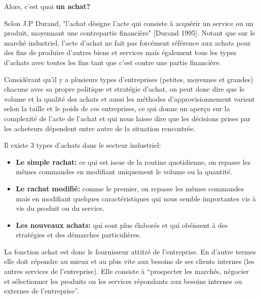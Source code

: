 \documentclass[12pt]{article}
\begin{document}
Alors, c’est quoi \textbf{un achat?}

Selon J.P Durand, "l'achat désigne l’acte qui consiste à acquérir un service ou un produit, moyennant une contrepartie financière" {\color{red}[Durand 1995]}. Notant que sur le marché industriel, l’acte d’achat ne fait pas forcément référence aux achats pour des fins de produire d’autres biens et services mais également tous les types d’achats avec toutes les fins tant que c’est contre une partie financière.

Considérant qu’il y a plusieurs types d’entreprises (petites, moyennes et grandes) chacune avec sa propre politique et stratégie d’achat, on peut donc dire que le volume et la qualité des achats et aussi les méthodes d’approvisionnement varient selon la taille et le poids de ces entreprises, ce qui donne un aperçu sur la complexité de l’acte de l’achat et qui nous laisse dire que les décisions prises par les acheteurs dépendent entre autre de la situation rencontrée.

Il existe 3 types d’achats dans le secteur industriel:
\begin{itemize}
\item \textbf{ Le simple rachat:} ce qui est issue de la routine quotidienne, on repasse les mêmes commandes en modifiant uniquement le volume ou la quantité. 
\item \textbf{Le rachat modifié:} comme le premier, on repasse les mêmes commandes mais en modifiant quelques caractéristiques qui nous semble importantes vis à vis du produit ou du service.
\item \textbf{Les nouveaux achats:} qui sont plus élaborés et qui obéissent à des stratégies et des démarches particulières.
\end{itemize}

La fonction achat est donc le fournisseur attitré de l'entreprise. En d'autre termes elle doit répondre au mieux et au plus vite aux besoins de ses clients internes (les autres services de l'entreprise). Elle consiste à “prospecter les marchés, négocier et sélectionner les produits ou les services répondants aux besoins internes ou externes de l'entreprise”.
\end{document}
